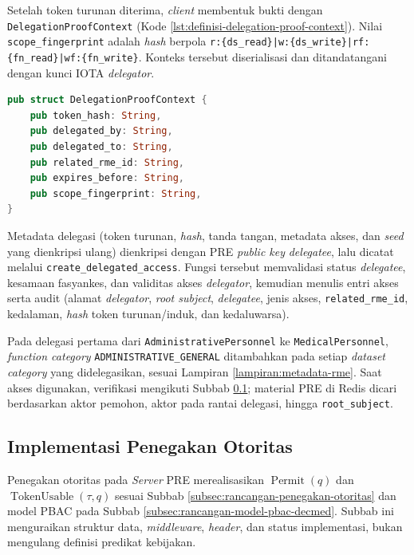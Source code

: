 \documentclass[bahasa, 12pt, a4paper, onecolumn, oneside, final]{report}
\begin{document}
Setelah token turunan diterima, \textit{client} membentuk bukti dengan \texttt{DelegationProofContext} (Kode \ref{lst:definisi-delegation-proof-context}). Nilai \texttt{scope\_fingerprint} adalah \textit{hash} berpola \verb!r:{ds_read}|w:{ds_write}|rf:{fn_read}|wf:{fn_write}!. Konteks tersebut diserialisasi dan ditandatangani dengan kunci IOTA \textit{delegator}.

\begin{lstlisting}[language=Rust, caption={Definisi \texttt{DelegationProofContext}}, label={lst:definisi-delegation-proof-context}]
pub struct DelegationProofContext {
    pub token_hash: String,
    pub delegated_by: String,
    pub delegated_to: String,
    pub related_rme_id: String,
    pub expires_before: String,
    pub scope_fingerprint: String,
}
\end{lstlisting}

Metadata delegasi (token turunan, \textit{hash}, tanda tangan, metadata akses, dan \textit{seed} yang dienkripsi ulang) dienkripsi dengan PRE \textit{public key} \textit{delegatee}, lalu dicatat melalui \texttt{create\_delegated\_access}. Fungsi tersebut memvalidasi status \textit{delegatee}, kesamaan fasyankes, dan validitas akses \textit{delegator}, kemudian menulis entri akses serta audit (alamat \textit{delegator}, \textit{root subject}, \textit{delegatee}, jenis akses, \texttt{related\_rme\_id}, kedalaman, \textit{hash} token turunan/induk, dan kedaluwarsa).

Pada delegasi pertama dari \texttt{AdministrativePersonnel} ke \texttt{MedicalPersonnel}, \textit{function category} \texttt{ADMINISTRATIVE\_GENERAL} ditambahkan pada setiap \textit{dataset category} yang didelegasikan, sesuai Lampiran \ref{lampiran:metadata-rme}. Saat akses digunakan, verifikasi mengikuti Subbab \ref{subsec:implementasi-penegakan-otoritas-pre}; material PRE di Redis dicari berdasarkan aktor pemohon, aktor pada rantai delegasi, hingga \texttt{root\_subject}.
\subsection{Implementasi Penegakan Otoritas}
\label{subsec:implementasi-penegakan-otoritas-pre}

Penegakan otoritas pada \textit{Server} PRE merealisasikan $\operatorname{Permit}(q)$ dan $\operatorname{TokenUsable}(\tau,q)$ sesuai Subbab \ref{subsec:rancangan-penegakan-otoritas} dan model PBAC pada Subbab \ref{subsec:rancangan-model-pbac-decmed}. Subbab ini menguraikan struktur data, \textit{middleware}, \textit{header}, dan status implementasi, bukan mengulang definisi predikat kebijakan.
\end{document}
